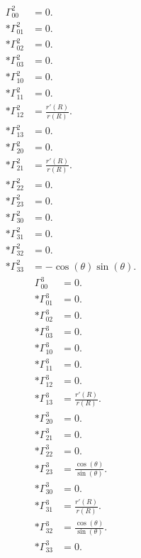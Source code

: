\documentclass[fleqn,portrait]{article}
\begin{document}
\begin{align*}
\Gamma^2_{00} & = 0. \\*
\Gamma^2_{01} & = 0. \\*
\Gamma^2_{02} & = 0. \\*
\Gamma^2_{03} & = 0. \\*
\Gamma^2_{10} & = 0. \\*
\Gamma^2_{11} & = 0. \\*
\Gamma^2_{12} & = \frac{r'(R)}{r(R)}. \\*
\Gamma^2_{13} & = 0. \\*
\Gamma^2_{20} & = 0. \\*
\Gamma^2_{21} & = \frac{r'(R)}{r(R)}. \\*
\Gamma^2_{22} & = 0. \\*
\Gamma^2_{23} & = 0. \\*
\Gamma^2_{30} & = 0. \\*
\Gamma^2_{31} & = 0. \\*
\Gamma^2_{32} & = 0. \\*
\Gamma^2_{33} & = - \cos(\theta) \sin(\theta).
\end{align*}
\begin{align*}
\Gamma^3_{00} & = 0. \\*
\Gamma^3_{01} & = 0. \\*
\Gamma^3_{02} & = 0. \\*
\Gamma^3_{03} & = 0. \\*
\Gamma^3_{10} & = 0. \\*
\Gamma^3_{11} & = 0. \\*
\Gamma^3_{12} & = 0. \\*
\Gamma^3_{13} & = \frac{r'(R)}{r(R)}. \\*
\Gamma^3_{20} & = 0. \\*
\Gamma^3_{21} & = 0. \\*
\Gamma^3_{22} & = 0. \\*
\Gamma^3_{23} & = \frac{\cos(\theta)}{\sin(\theta)}. \\*
\Gamma^3_{30} & = 0. \\*
\Gamma^3_{31} & = \frac{r'(R)}{r(R)}. \\*
\Gamma^3_{32} & = \frac{\cos(\theta)}{\sin(\theta)}. \\*
\Gamma^3_{33} & = 0.
\end{align*}
\end{document}
